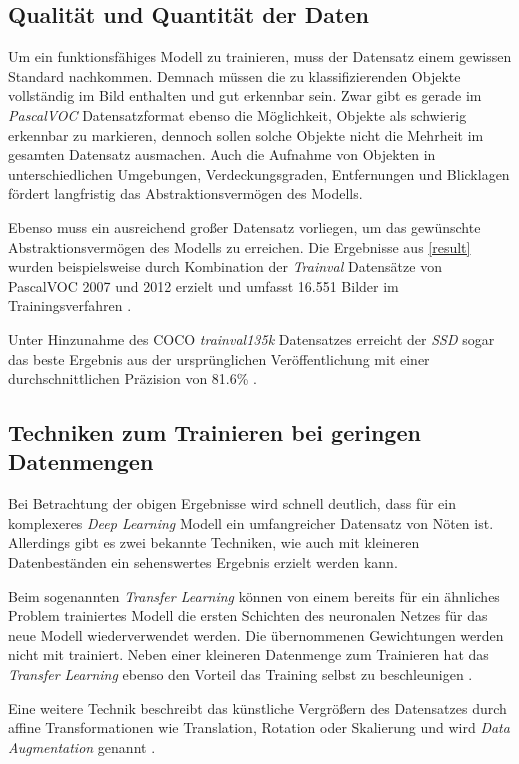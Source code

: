 \subsection*{Qualität und Quantität der Daten}

Um ein funktionsfähiges Modell zu trainieren, muss der Datensatz einem gewissen Standard nachkommen. Demnach müssen die zu klassifizierenden Objekte vollständig im Bild enthalten und gut erkennbar sein. Zwar gibt es gerade im \textit{PascalVOC} Datensatzformat ebenso die Möglichkeit, Objekte als \glqq schwierig erkennbar\grqq{} zu markieren, dennoch sollen solche Objekte nicht die Mehrheit im gesamten Datensatz ausmachen. Auch die Aufnahme von Objekten in unterschiedlichen Umgebungen, Verdeckungsgraden, Entfernungen und Blicklagen fördert langfristig das Abstraktionsvermögen des Modells. 

Ebenso muss ein ausreichend großer Datensatz vorliegen, um das gewünschte Abstraktionsvermögen des Modells zu erreichen. Die Ergebnisse aus \ref{result} wurden beispielsweise durch Kombination der \textit{Trainval} Datensätze von PascalVOC 2007 und 2012 erzielt und umfasst 16.551 Bilder im Trainingsverfahren \cite{ssd.20161229} \cite{MarkEveringham.20070607} \cite{MarkEveringham.20120521}. 

Unter Hinzunahme des COCO \textit{trainval135k} Datensatzes erreicht der \textit{SSD} sogar das beste Ergebnis aus der ursprünglichen Veröffentlichung mit einer durchschnittlichen Präzision von 81.6\% \cite{ssd.20161229}. 

\subsection*{Techniken zum Trainieren bei geringen Datenmengen}

Bei Betrachtung der obigen Ergebnisse wird schnell deutlich, dass für ein komplexeres \textit{Deep Learning} Modell ein umfangreicher Datensatz von Nöten ist. Allerdings gibt es zwei bekannte Techniken, wie auch mit kleineren Datenbeständen ein sehenswertes Ergebnis erzielt werden kann. 

Beim sogenannten \textit{Transfer Learning} können von einem bereits für ein ähnliches Problem trainiertes Modell die ersten Schichten des neuronalen Netzes für das neue Modell wiederverwendet werden. Die übernommenen Gewichtungen werden nicht mit trainiert. Neben einer kleineren Datenmenge zum Trainieren hat das \textit{Transfer Learning} ebenso den Vorteil das Training selbst zu beschleunigen \cite{AurelienGeron.2018}.

Eine weitere Technik beschreibt das künstliche Vergrößern des Datensatzes durch affine Transformationen wie Translation, Rotation oder Skalierung und wird \textit{Data Augmentation} genannt \cite{AurelienGeron.2018}.
